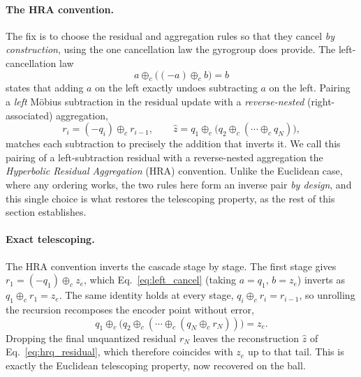 \documentclass[12pt]{report}
\begin{document}
\paragraph{The HRA convention.} The fix is to choose the residual and aggregation rules so that they cancel \emph{by construction}, using the one cancellation law the gyrogroup does provide. The left-cancellation law
\begin{equation}
    \label{eq:left_cancel}
    a \oplus_c\big((-a)\oplus_c b\big) = b
\end{equation}
states that adding $a$ on the left exactly undoes subtracting $a$ on the left. Pairing a \emph{left} M\"obius subtraction in the residual update with a \emph{reverse-nested} (right-associated) aggregation,
\begin{equation}
    \label{eq:hrq_residual}
    r_i = (-q_i)\oplus_c r_{i-1},
    \qquad
    \hat z = q_1\oplus_c\big(q_2\oplus_c(\cdots\oplus_c q_{N})\big),
\end{equation}
matches each subtraction to precisely the addition that inverts it. We call this pairing of a left-subtraction residual with a reverse-nested aggregation the \emph{Hyperbolic Residual Aggregation} (HRA) convention. Unlike the Euclidean case, where any ordering works, the two rules here form an inverse pair \emph{by design}, and this single choice is what restores the telescoping property, as the rest of this section establishes.

\paragraph{Exact telescoping.} The HRA convention inverts the cascade stage by stage. The first stage gives $r_1=(-q_1)\oplus_c z_e$, which Eq.~\ref{eq:left_cancel} (taking $a=q_1$, $b=z_e$) inverts as $q_1\oplus_c r_1=z_e$. The same identity holds at every stage, $q_i\oplus_c r_i=r_{i-1}$, so unrolling the recursion recomposes the encoder point without error,
\begin{equation*}
    q_1\oplus_c\big(q_2\oplus_c(\cdots\oplus_c(q_{N}\oplus_c r_{N}))\big)=z_e .
\end{equation*}
Dropping the final unquantized residual $r_{N}$ leaves the reconstruction $\hat z$ of Eq.~\ref{eq:hrq_residual}, which therefore coincides with $z_e$ up to that tail. This is exactly the Euclidean telescoping property, now recovered on the ball.
\end{document}
